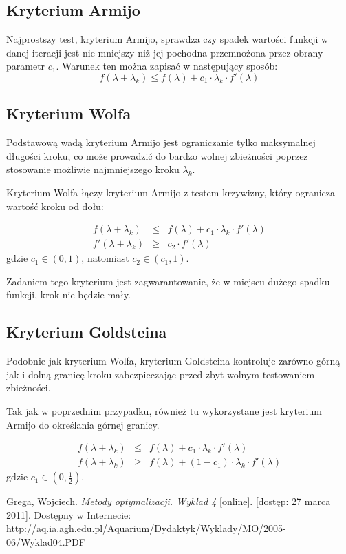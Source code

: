 \documentclass{classrep}
\begin{document}
\subsection{Kryterium Armijo}
Najprostszy test, kryterium Armijo, sprawdza czy spadek wartości funkcji w danej iteracji jest nie mniejszy niż jej pochodna przemnożona przez obrany parametr $c_1$. Warunek ten można zapisać w następujący sposób:
\begin{equation}
 f(\lambda + \lambda_k) \leq f(\lambda) + c_1 \cdot \lambda_k \cdot f'(\lambda)
\end{equation}

\subsection{Kryterium Wolfa}
Podstawową wadą kryterium Armijo jest ograniczanie tylko maksymalnej długości kroku, co może prowadzić do bardzo wolnej zbieżności \ppauza poprzez stosowanie możliwie najmniejszego kroku $\lambda_k$.

Kryterium Wolfa łączy kryterium Armijo z testem krzywizny, który ogranicza wartość kroku od dołu:

\begin{eqnarray}
    f(\lambda + \lambda_k)  & \leq & f(\lambda) + c_1 \cdot \lambda_k \cdot f'(\lambda) \\
    f'(\lambda + \lambda_k) & \geq & c_2 \cdot f'(\lambda)
\end{eqnarray}
gdzie $c_1 \in (0, 1)$, natomiast $c_2 \in (c_1, 1)$.

Zadaniem tego kryterium jest zagwarantowanie, że w miejscu dużego spadku funkcji, krok nie będzie mały.

\subsection{Kryterium Goldsteina}
Podobnie jak kryterium Wolfa, kryterium Goldsteina kontroluje zarówno górną jak i dolną granicę kroku zabezpieczając przed zbyt wolnym testowaniem zbieżności.

Tak jak w poprzednim przypadku, również tu wykorzystane jest kryterium Armijo do określania górnej granicy.

\begin{eqnarray}
    f(\lambda + \lambda_k) & \leq & f(\lambda) + c_1 \cdot \lambda_k \cdot f'(\lambda) \\
    f(\lambda + \lambda_k) & \geq & f(\lambda) + (1 - c_1) \cdot \lambda_k \cdot f'(\lambda)
\end{eqnarray}
gdzie $c_1 \in (0, \frac{1}{2})$.

\begin{thebibliography}{99}
Grega, Wojciech. \textit{Metody optymalizacji. Wykład 4} [online]. [dostęp: 27
marca 2011]. Dostępny w Internecie:
http://aq.ia.agh.edu.pl/Aquarium/Dydaktyk/Wyklady/MO/2005-06/Wyklad04.PDF
\end{thebibliography}
\end{document}
